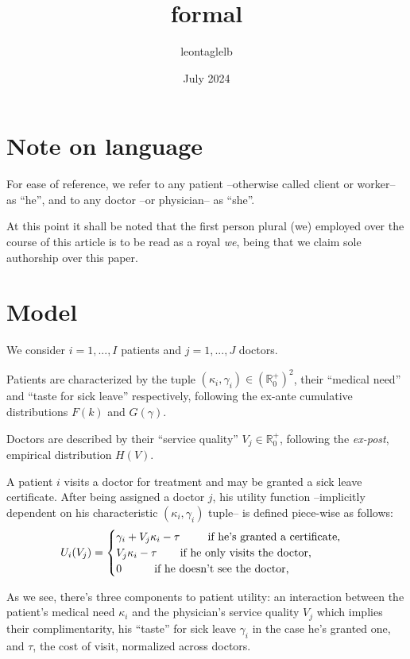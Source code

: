 \documentclass{article}
\title{formal}
\author{leontaglelb }
\date{July 2024}
\begin{document}
\section{Note on language}

For ease of reference, we refer to any patient --otherwise called client or worker-- as ``he'', and to any doctor --or physician-- as ``she''.

At this point it shall be noted that the first person plural (we) employed over the course of this article is to be read as a royal \textit{we}, being that we claim sole authorship over this paper.


\section{Model}

We consider $i = 1, ..., I$ patients and $j = 1, ..., J$ doctors.

Patients are characterized by the tuple $(\kappa_i,\gamma_i) \in (\mathbb{R}_0^+)^2$, their ``medical need'' and ``taste for sick leave'' respectively, following the ex-ante cumulative distributions $F(k)$ and $G(\gamma)$.

Doctors are described by their ``service quality'' $V_j \in \mathbb{R}_0^+$, following the \textit{ex-post}, empirical distribution $H(V)$.

A patient $i$ visits a doctor for treatment and may be granted a sick leave certificate. After being assigned a doctor $j$, his utility function --implicitly dependent on his characteristic $(\kappa_i,\gamma_i)$ tuple-- is defined piece-wise as follows:
    \[
U_i(V_j) =\begin{cases}
\gamma_i + V_j \kappa_i - \tau \text{  \hspace{0.65cm} if he’s granted a certificate,} \\
V_j \kappa_i - \tau \text{  \hspace{0.5cm} if he only visits the doctor,} \\
0 \text{  \hspace{0.8cm} if he doesn't see the doctor,}
\end{cases}
\]

As we see, there's three components to patient utility: an interaction between the patient's medical need $\kappa_i$ and the physician's service quality $V_j$ which implies their complimentarity, his ``taste'' for sick leave $\gamma_i$ in the case he's granted one, and $\tau$, the cost of visit, normalized across doctors.
\end{document}
